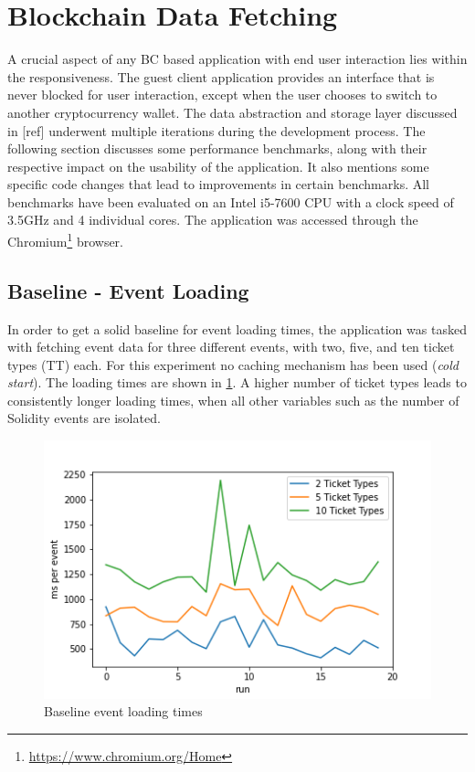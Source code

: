 \section{Blockchain Data Fetching}\label{section:data-model}

A crucial aspect of any BC based application with end user interaction lies within the responsiveness. The guest client application provides an interface that is never blocked for user interaction, except when the user chooses to switch to another cryptocurrency wallet. The data abstraction and storage layer discussed in [ref] underwent multiple iterations during the development process. The following section discusses some performance benchmarks, along with their respective impact on the usability of the application. It also mentions some specific code changes that lead to improvements in certain benchmarks. All benchmarks have been evaluated on an Intel i5-7600 CPU with a clock speed of 3.5GHz and 4 individual cores. The application was accessed through the Chromium\footnote{\href{https://www.chromium.org/Home}{https://www.chromium.org/Home}} browser.

\subsection{Baseline - Event Loading}\label{section:bl-events}
In order to get a solid baseline for event loading times, the application was tasked with fetching event data for three different events, with two, five, and ten ticket types (TT) each. For this experiment no caching mechanism has been used (\textit{cold start}). The loading times are shown in \ref{img:baseline1}. A higher number of ticket types leads to consistently longer loading times, when all other variables such as the number of Solidity events are isolated.

\begin{figure}[H]
    \centering
    \includegraphics[width=14cm]{images/plot1.png}
    \caption{Baseline event loading times}
    \label{img:baseline1}
\end{figure}

